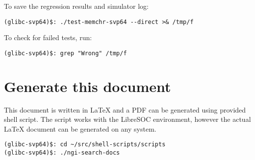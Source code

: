 To save the regression results and simulator log:

\begin{verbatim}
(glibc-svp64)$: ./test-memchr-svp64 --direct >& /tmp/f
\end{verbatim}

To check for failed tests, run:

\begin{verbatim}
(glibc-svp64)$: grep "Wrong" /tmp/f
\end{verbatim}

\section{Generate this document}

This document is written in \LaTeX{} and a PDF can be generated using provided
shell script. The script works with the LibreSOC environment, however the
actual \LaTeX{} document can be generated on any system.

\begin{verbatim}
(glibc-svp64)$: cd ~/src/shell-scripts/scripts
(glibc-svp64)$: ./ngi-search-docs
\end{verbatim}
